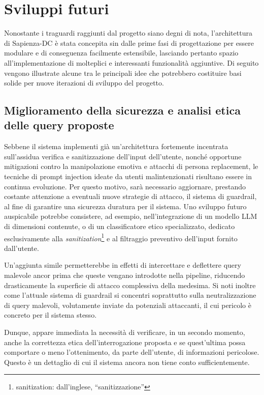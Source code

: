 \section{Sviluppi futuri}
Nonostante i traguardi raggiunti dal progetto siano degni di nota, l'architettura di Sapienza-DC è stata concepita sin dalle prime fasi di progettazione per essere modulare e di conseguenza facilmente estensibile, lasciando pertanto spazio all'implementazione di molteplici e interessanti funzionalità aggiuntive. Di seguito vengono illustrate alcune tra le principali idee che potrebbero costituire basi solide per nuove iterazioni di sviluppo del progetto.

\subsection{Miglioramento della sicurezza e analisi etica delle query proposte}
Sebbene il sistema implementi già un'architettura fortemente incentrata sull'assidua verifica e sanitizzazione dell'input dell'utente, nonché opportune mitigazioni contro la manipolazione emotiva e attacchi di persona replacement, le tecniche di prompt injection ideate da utenti malintenzionati risultano essere in continua evoluzione. Per questo motivo, sarà necessario aggiornare, prestando costante attenzione a eventuali nuove strategie di attacco, il sistema di guardrail, al fine di garantire una sicurezza duratura per il sistema. Uno sviluppo futuro auspicabile potrebbe consistere, ad esempio, nell'integrazione di un modello LLM di dimensioni contenute, o di un classificatore etico specializzato, dedicato esclusivamente alla \textit{sanitization}\footnote{sanitization: dall'inglese, ``sanitizzazione''} e al filtraggio preventivo dell'input fornito dall'utente. 

Un'aggiunta simile permetterebbe in effetti di intercettare e deflettere query malevole ancor prima che queste vengano introdotte nella pipeline, riducendo drasticamente la superficie di attacco complessiva della medesima. Si noti inoltre come l'attuale sistema di guardrail si concentri soprattutto sulla neutralizzazione di query malevoli, volutamente inviate da potenziali attaccanti, il cui pericolo è concreto per il sistema stesso. 

Dunque, appare immediata la necessità di verificare, in un secondo momento, anche la correttezza etica dell'interrogazione proposta e se quest'ultima possa comportare o meno l'ottenimento, da parte dell'utente, di informazioni pericolose. Questo è un dettaglio di cui il sistema ancora non tiene conto sufficientemente.      

